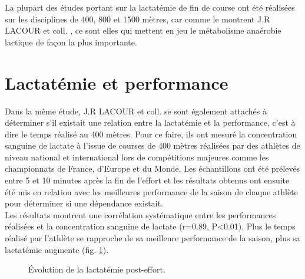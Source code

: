         
        La plupart des études portant sur la lactatémie de fin de course ont été réalisées sur les disciplines de 400, 800 et 1500 mètres, car comme le montrent J.R LACOUR et coll.             \cite{lacour90}, ce sont elles qui mettent en jeu le métabolisme anaérobie lactique de façon la plus importante.\\
    
    
    \section{Lactatémie et performance}
        
        Dans la même étude, J.R LACOUR et coll. \cite{lacour90} se sont également attachés à déterminer s'il existait une relation entre la lactatémie et la performance, c'est à dire le temps réalisé au 400 mètres. Pour ce faire, ils ont mesuré la concentration sanguine de lactate à l'issue de courses de 400 mètres réalisées par des athlètes de niveau national et international lors de compétitions majeures comme les championnats de France, d'Europe et du Monde. Les échantillons ont été prélevés entre 5 et 10 minutes après la fin de l'effort et les résultats obtenus ont ensuite été mis en relation avec les meilleures performance de la saison de chaque athlète pour déterminer si une dépendance existait.\\           
        
        Les résultats montrent une corrélation systématique entre les performances réalisées et la concentration sanguine de lactate (r=0.89, P<0.01). Plus le temps réalisé par l'athlète se rapproche de sa meilleure performance de la saison, plus sa lactatémie augmente (fig. \ref{fig:lactate_velocite}). 
        
         \begin{figure}[H]
            \centering
            \caption{\label{fig:lactate_velocite} Évolution de la lactatémie post-effort.}
        \end{figure}
        
